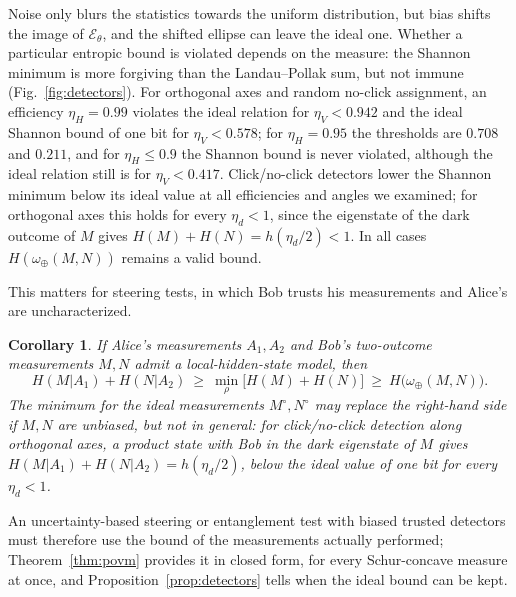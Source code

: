 \documentclass[11pt]{article}
\newtheorem{corollary}{Corollary}
\theoremstyle{definition}
\newcommand{\omplus}{\omega_{\oplus}}
\begin{document}
Noise only blurs the statistics towards the uniform distribution, but bias
shifts the image of $\mathcal E_\theta$, and the shifted ellipse can leave the
ideal one. Whether a particular entropic bound is violated depends on the
measure: the Shannon minimum is more forgiving than the Landau--Pollak sum, but
not immune (Fig.~\ref{fig:detectors}). For orthogonal axes and random no-click
assignment, an efficiency $\eta_H=0.99$ violates the ideal relation for
$\eta_V<0.942$ and the ideal Shannon bound of one bit for $\eta_V<0.578$; for
$\eta_H=0.95$ the thresholds are $0.708$ and $0.211$, and for $\eta_H\le0.9$ the
Shannon bound is never violated, although the ideal relation still is for
$\eta_V<0.417$. Click/no-click detectors lower the Shannon minimum below its
ideal value at all efficiencies and angles we examined; for orthogonal axes this
holds for every $\eta_d<1$, since the eigenstate of the dark outcome of $M$ gives
$H(M)+H(N)=h(\eta_d/2)<1$. In all
cases $H(\omplus(M,N))$ remains a valid bound.

This matters for steering tests\cite{Walborn2011,Schneeloch2013,Uola2020}, in
which Bob trusts his measurements and Alice's are uncharacterized.

\begin{corollary}\label{cor:steering}
If Alice's measurements $A_1,A_2$ and Bob's two-outcome measurements $M,N$
admit a local-hidden-state model, then
\begin{equation}
  H(M|A_1)+H(N|A_2)\ \ge\ \min_\rho\bigl[H(M)+H(N)\bigr]\ \ge\ H\bigl(\omplus(M,N)\bigr).
  \label{eq:steering}
\end{equation}
The minimum for the ideal measurements $M^\circ,N^\circ$ may replace the right-hand
side if $M,N$ are unbiased, but not in general: for click/no-click detection
along orthogonal axes, a product state with Bob in the dark eigenstate of $M$
gives $H(M|A_1)+H(N|A_2)=h(\eta_d/2)$, below the ideal value of one bit for every
$\eta_d<1$.
\end{corollary}

An uncertainty-based steering or entanglement test with biased trusted
detectors must therefore use the bound of the measurements actually performed;
Theorem~\ref{thm:povm} provides it in closed form, for every Schur-concave
measure at once, and Proposition~\ref{prop:detectors} tells when the ideal bound
can be kept.
\end{document}
